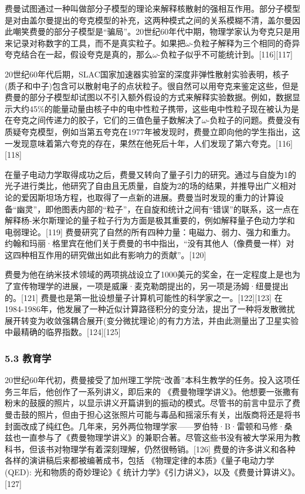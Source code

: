 费曼试图通过一种叫做部分子模型的理论来解释核散射的强相互作用。部分子模型是对由盖尔曼提出的夸克模型的补充，这两种模式之间的关系模糊不清，盖尔曼因此嘲笑费曼的部分子模型是“骗局”。20世纪60年代中期，物理学家认为夸克只是用来记录对称数字的工具，而不是真实粒子。如果把$\omega$-负粒子解释为三个相同的奇异夸克结合在一起，假设夸克是真的，那么$\omega$-负粒子似乎不可能统计到。[116][117]

20世纪60年代后期，SLAC国家加速器实验室的深度非弹性散射实验表明，核子(质子和中子)包含可以散射电子的点状粒子。很自然可以用夸克来鉴定这些，但是费曼的部分子模型却试图以不引入额外假设的方式来解释实验数据。例如，数据显示大约45\%的能量动量由核子中的电中性粒子携带，这些电中性粒子现在被认为是在夸克之间传递力的胶子，它们的三值色量子数解决了$\omega$-负粒子的问题。费曼没有质疑夸克模型，例如当第五夸克在1977年被发现时，费曼立即向他的学生指出，这一发现意味着第六夸克的存在，果然在他死后十年，人们发现了第六夸克。[116][118]

在量子电动力学取得成功之后，费曼又转向了量子引力的研究。通过与自旋为1的光子进行类比，他研究了自由且无质量，自旋为2的场的结果，并推导出广义相对论的爱因斯坦场方程，也取得了一点新的进展。费曼当时发现的重力的计算设备“幽灵”，即他图表内部的“粒子”，在自旋和统计之间有“错误”的联系，这一点在解释杨-米尔斯理论的量子粒子行为方面是极其重要的，例如解释量子色动力学和电弱理论。[119] 费曼研究了自然的所有四种力量：电磁力、弱力、强力和重力。约翰和玛丽·格里宾在他们关于费曼的书中指出，“没有其他人（像费曼一样）对这四种相互作用的研究做出如此有影响力的贡献”。[120]

费曼为他在纳米技术领域的两项挑战设立了1000美元的奖金，在一定程度上是也为了宣传物理学的进展，一项是威廉·麦克勒朗提出的，另一项是汤姆·纽曼提出的。[121] 费曼也是第一批设想量子计算机可能性的科学家之一。[122][123] 在1984-1986年，他发展了一种近似计算路径积分的变分法，提出了一种将发散微扰展开转变为收敛强耦合展开(变分微扰理论)的有力方法，并由此测量出了卫星实验中最精确的临界指数。[124][125]

\subsubsection{5.3 教育学}
20世纪60年代初，费曼接受了加州理工学院“改善”本科生教学的任务。投入这项任务三年后，他创作了一系列讲义，即后来的 《费曼物理学讲义》。他想要一张撒有粉末的鼓膜的照片，以显示讲义开篇讲到的振动的模式。尽管书的前言中显示了费曼击鼓的照片，但由于担心这张照片可能与毒品和摇滚乐有关，出版商将还是将书封面改成了纯红色。几年来，另外两位物理学家——罗伯特·B·雷顿和马修·桑兹也一直参与了《费曼物理学讲义》的兼职合著。尽管这些书没有被大学采用为教科书，但该书对物理学有着深刻理解，仍然很畅销。[126] 费曼的许多讲义和各种各样的演讲稿后来都被编著成书，包括 《物理定律的本质》《量子电动力学(QED): 光和物质的奇妙理论》《 统计力学》《引力讲义》，以及《费曼计算讲义》。[127]

